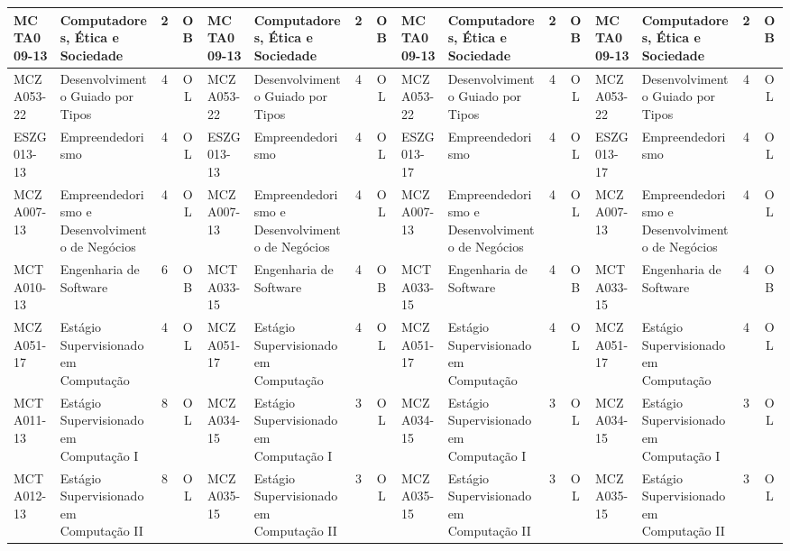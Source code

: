 \documentclass[a4paper]{article}
\begin{document}
\begin{landscape}
{\begin{longtable}{|l|p{.15\textheight}|c|c||l|p{.15\textheight}|c|c||l|p{.15\textheight}|c|c||l|p{.15\textheight}|c|c|}
    MCTA009-13 & Computadores, Ética e Sociedade & 2 & OB &
    MCTA009-13 & Computadores, Ética e Sociedade & 2 & OB &
    MCTA009-13 & Computadores, Ética e Sociedade & 2 & OB &
    MCTA009-13 & Computadores, Ética e Sociedade & 2 & OB \\ \hline

    MCZA053-22 & Desenvolvimento Guiado por Tipos & 4 & OL &
    MCZA053-22 & Desenvolvimento Guiado por Tipos & 4 & OL &
    MCZA053-22 & Desenvolvimento Guiado por Tipos & 4 & OL &
    MCZA053-22 & Desenvolvimento Guiado por Tipos & 4 & OL\\ \hline

    ESZG013-13 & Empreendedorismo & 4 & OL &
    ESZG013-13 & Empreendedorismo & 4 & OL &
    ESZG013-17 & Empreendedorismo & 4 & OL &
    ESZG013-17 & Empreendedorismo & 4 & OL \\ \hline
    
    MCZA007-13 & Empreendedorismo e Desenvolvimento de Negócios & 4 & OL &
    MCZA007-13 & Empreendedorismo e Desenvolvimento de Negócios & 4 & OL &
    MCZA007-13 & Empreendedorismo e Desenvolvimento de Negócios & 4 & OL &
    MCZA007-13 & Empreendedorismo e Desenvolvimento de Negócios & 4 & OL \\ \hline

    MCTA010-13 & Engenharia de Software & 6 &  OB &
    MCTA033-15 & Engenharia de Software & 4 &  OB &
    MCTA033-15 & Engenharia de Software & 4 &  OB &
    MCTA033-15 & Engenharia de Software & 4 &  OB \\ \hline

    MCZA051-17 & Estágio Supervisionado em Computação & 4 & OL &
    MCZA051-17 & Estágio Supervisionado em Computação & 4 & OL &
    MCZA051-17 & Estágio Supervisionado em Computação & 4 & OL &
    MCZA051-17 & Estágio Supervisionado em Computação & 4 & OL \\ \hline

    MCTA011-13 & Estágio Supervisionado em Computação I & 8 & OL &
    MCZA034-15 & Estágio Supervisionado em Computação I & 3 & OL &
    MCZA034-15 & Estágio Supervisionado em Computação I & 3 & OL &
    MCZA034-15 & Estágio Supervisionado em Computação I & 3 & OL \\ \hline

    MCTA012-13 & Estágio Supervisionado em Computação II & 8 & OL &
    MCZA035-15 & Estágio Supervisionado em Computação II & 3 & OL &
    MCZA035-15 & Estágio Supervisionado em Computação II & 3 & OL &
    MCZA035-15 & Estágio Supervisionado em Computação II & 3 & OL \\ \hline


\end{longtable}}
\end{landscape}
\end{document}

